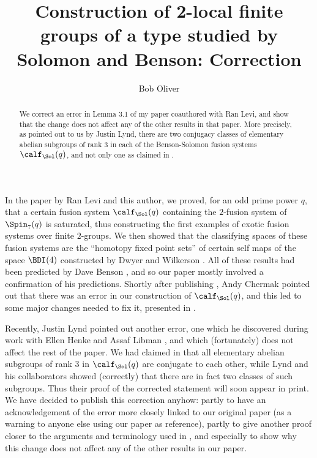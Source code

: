 \documentclass[12pt,reqno]{amsart}
\title[Benson-Solomon fusion systems: correction]{Construction of 2-local 
finite groups of a type studied by Solomon and Benson: Correction}
\author{Bob Oliver}
\newcommand{\0}[1]{\textup{\textbf{\uppercase{#1}}}}
\renewcommand{\2}[1]{\textup{\textbf{2\uppercase{#1}}}}
\newcommand{\3}[1]{\textup{\textbf{3\uppercase{#1}}}}
\newcommand{\4}[1]{\overline{#1}}   %
\newcommand{\5}[1]{\widehat{#1}}
\newcommand{\6}[1]{\widetilde{#1}}
\newcommand{\7}{^\vee}
\newcommand{\9}[2][0]{{}^{#2}\hskip-#1pt}   %
\renewcommand{\*}{\raisebox{-1pt}{\textup{\begin{Large}$*$\end{Large}}}}
\renewcommand{\:}{\colon}   %
\numberwithin{table}{section}
\theoremstyle{definition}
\theoremstyle{definition}
\theoremstyle{remark}
\begin{document}
\begin{abstract} 
We correct an error in Lemma 3.1 of my paper \cite{LO} coauthored with Ran 
Levi, and show that the change does not affect any of the other results in 
that paper. More precisely, as pointed out to us by Justin Lynd, there are 
two conjugacy classes of elementary abelian subgroups of rank $3$ in each 
of the Benson-Solomon fusion systems $\calf_\Sol(q)$, and not only one as 
claimed in \cite{LO}.
\end{abstract}

\maketitle

In the paper \cite{LO} by Ran Levi and this author, we proved, for an odd 
prime power $q$, that a certain fusion system $\calf_\Sol(q)$ containing 
the $2$-fusion system of $\Spin_7(q)$ is saturated, thus constructing the 
first examples of exotic fusion systems over finite $2$-groups. We then 
showed that the classifying spaces of these fusion systems are the 
``homotopy fixed point sets'' of certain self maps of the space $\BDI(4)$ 
constructed by Dwyer and Wilkerson \cite{DW}. All of these results had been 
predicted by Dave Benson \cite{Benson}, and so our paper mostly involved a 
confirmation of his predictions. Shortly after publishing \cite{LO}, Andy 
Chermak pointed out that there was an error in our construction of 
$\calf_\Sol(q)$, and this led to some major changes needed to fix it, 
presented in \cite{LO-corr}. 

Recently, Justin Lynd pointed out another error, one which he discovered 
during work with Ellen Henke and Assaf Libman \cite{HLL}, and which 
(fortunately) does not affect the rest of the paper. We had claimed in 
\cite[Lemma 3.1]{LO} that all elementary abelian subgroups of rank $3$ in 
$\calf_\Sol(q)$ are conjugate to each other, while Lynd and his 
collaborators \cite[Lemma 4.8]{HLL} showed (correctly) that there are in 
fact two classes of such subgroups. Thus their proof of the corrected 
statement will soon appear in print. We have decided to publish this 
correction anyhow: partly to have an acknowledgement of the error more 
closely linked to our original paper (as a warning to anyone else using our 
paper as reference), partly to give another proof closer to the arguments 
and terminology used in \cite{LO}, and especially to show why this 
change does not affect any of the other results in our paper. 
\end{document}
